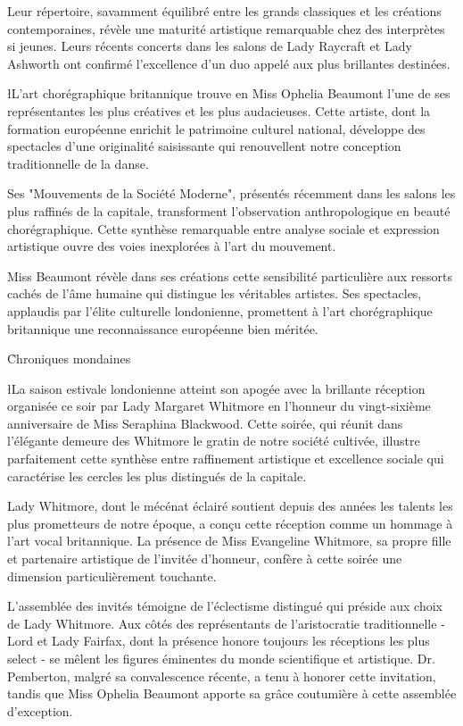 \documentclass{news}
\begin{document}
Leur répertoire, savamment équilibré entre les grands classiques et les créations contemporaines, révèle une maturité artistique remarquable chez des interprètes si jeunes. Leurs récents concerts dans les salons de Lady Raycraft et Lady Ashworth ont confirmé l'excellence d'un duo appelé aux plus brillantes destinées.

\l{L}'art chorégraphique britannique trouve en Miss Ophelia Beaumont l'une de ses représentantes les plus créatives et les plus audacieuses. Cette artiste, dont la formation européenne enrichit le patrimoine culturel national, développe des spectacles d'une originalité saisissante qui renouvellent notre conception traditionnelle de la danse.

Ses "Mouvements de la Société Moderne", présentés récemment dans les salons les plus raffinés de la capitale, transforment l'observation anthropologique en beauté chorégraphique. Cette synthèse remarquable entre analyse sociale et expression artistique ouvre des voies inexplorées à l'art du mouvement.

Miss Beaumont révèle dans ses créations cette sensibilité particulière aux ressorts cachés de l'âme humaine qui distingue les véritables artistes. Ses spectacles, applaudis par l'élite culturelle londonienne, promettent à l'art chorégraphique britannique une reconnaissance européenne bien méritée.

\h{Chroniques mondaines}

\l{L}a saison estivale londonienne atteint son apogée avec la brillante réception organisée ce soir par Lady Margaret Whitmore en l'honneur du vingt-sixième anniversaire de Miss Seraphina Blackwood. Cette soirée, qui réunit dans l'élégante demeure des Whitmore le gratin de notre société cultivée, illustre parfaitement cette synthèse entre raffinement artistique et excellence sociale qui caractérise les cercles les plus distingués de la capitale.

Lady Whitmore, dont le mécénat éclairé soutient depuis des années les talents les plus prometteurs de notre époque, a conçu cette réception comme un hommage à l'art vocal britannique. La présence de Miss Evangeline Whitmore, sa propre fille et partenaire artistique de l'invitée d'honneur, confère à cette soirée une dimension particulièrement touchante.

L'assemblée des invités témoigne de l'éclectisme distingué qui préside aux choix de Lady Whitmore. Aux côtés des représentants de l'aristocratie traditionnelle - Lord et Lady Fairfax, dont la présence honore toujours les réceptions les plus select - se mêlent les figures éminentes du monde scientifique et artistique. Dr. Pemberton, malgré sa convalescence récente, a tenu à honorer cette invitation, tandis que Miss Ophelia Beaumont apporte sa grâce coutumière à cette assemblée d'exception.
\end{document}
